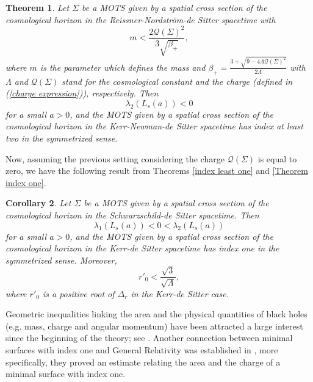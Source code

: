 \documentclass[a4paper, 11pt, reqno]{amsart}
\newtheorem{theo}{Theorem}[]
\newtheorem{coro}[theo]{Corollary}
\begin{document}
\begin{theo}\label{index least two}
Let $\Sigma$ be a MOTS given by a spatial cross section of the cosmological horizon in the Reissner-Nordström-de Sitter spacetime
with
\begin{equation}\label{mass hypothesis-2}
        m<\frac{2\mathcal{Q}(\Sigma)^2}{3\sqrt{\beta_+}},
     \end{equation}
   where $m$ is the parameter which defines the mass and  $\beta_+=\frac{3+\sqrt{9-4\Lambda\mathcal{Q}(\Sigma)^2}}{2\Lambda}$ with $\Lambda$ and $\mathcal{Q}(\Sigma)$ stand for the cosmological constant and the charge (defined in (\ref{charge expression})), respectively.
Then
\begin{equation*}
    \lambda_2(L_s(a)) <0
\end{equation*}
for a small $a>0$, and the MOTS given by a spatial cross section of the cosmological horizon in the Kerr-Newman-de Sitter spacetime has index at least two in the symmetrized sense.
\end{theo}
Now, assuming the previous setting considering the charge $\mathcal{Q}(\Sigma)$ is equal to zero, we have the following result from Theorems \ref{index least one} and \ref{Theorem index one}.

\begin{coro}\label{cor-2}
  Let $\Sigma$ be a MOTS given by a spatial cross section of the cosmological horizon in the Schwarzschild-de Sitter spacetime.
Then
\begin{equation*}
    \lambda_1(L_s(a))<0<\lambda_2(L_s(a)) 
\end{equation*}
for a small $a>0$, and the MOTS given by a spatial cross section of the cosmological horizon in the Kerr-de Sitter spacetime has index one in the symmetrized sense. Moreover,
\begin{equation*}
    r'_0<\frac{\sqrt{3}}{\sqrt{\Lambda}},
\end{equation*}
where $r'_0$ is a positive root of $\Delta_r$ in the Kerr-de Sitter case.
\end{coro}

Geometric inequalities linking the area and the physical quantities of black holes (e.g. mass, charge and angular momentum) have been attracted a large interest since the beginning of the theory; see \cite{BK,CRS,DJR,DGC, S}. Another connection between minimal surfaces with index one and General Relativity was established in \cite{CLS}, more specifically, they proved an estimate relating the area and the charge of a minimal surface with index one.
\end{document}
